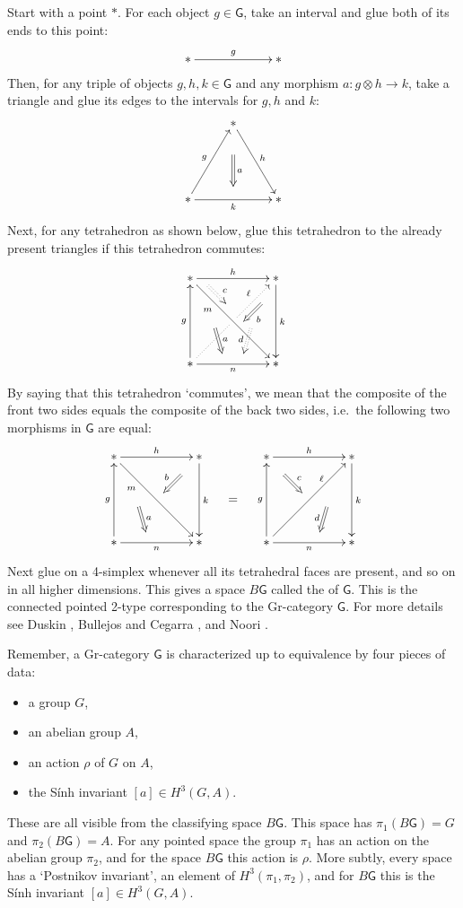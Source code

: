 \documentclass[reqno,12pt]{amsart}
\newcommand{\maps}{\colon}    %
\newcommand{\G}{{\mathsf{G}}}   %
\newcommand{\define}[1]{\textbf{\boldmath{#1}}}
\theoremstyle{definition}
\begin{document}
Start with a point $\ast$.  For each object $g \in \G$, take an interval and glue both of its ends to this point:
\[
\xy 0;/r3pc/:
   (0,0)*+{\ast}="x";
    (2,0)*+{\ast}="z";
 {\ar^{g} "x";"z"};
\endxy
\]
Then, for any triple of objects $g,h,k \in \G$ and any morphism $a \maps g \otimes h \to k$, take a triangle and glue its edges to the intervals for $g, h$ and $k$:
\[
\xy 0;/r3pc/:
   (0,0)*+{\ast}="x";
    (1,1.7)*+{\ast}="y";
    (2,0)*+{\ast}="z";
{\ar@2{->}^-{a} (1,1)*{};(1,0.3)*{}};
 {\ar^{g} "x";"y"};
 {\ar^{h} "y";"z"};
 {\ar_{k} "x";"z"};
\endxy
\]
Next, for any tetrahedron as shown below, glue this tetrahedron to the already present triangles if this tetrahedron commutes:
\[
{\xy 
(12,-12)*+{\ast}="1"; 
(12,12)*+{\ast}="2"; 
(-12,12)*+{\ast}="3"; 
(-12,-12)*+{\ast}="4"; 
(0,0)*+{}="0"; 
{\ar^-{k} "2";"1"}; 
{\ar^-{h} "3";"2"}; 
{\ar^-{g} "4";"3"};
{\ar_-{n} "4";"1"};
{\ar@{.>}^(0.5){\tiny{\ell}} "0";"2"};
{\ar@{.} "4";"0"};
{\ar_(0.3){m} "3";"1"};
{\ar@2{->}^-{a} (-5,-2)*{};(-3,-9)*{}};
{\ar@2{->}^-{b} (8,5)*{};(3,0)*{}};
{\ar@2{.>}^(0.6){c} (-7,10)*{};(-2,5)*{}};
{\ar@2{.>}_-{d} (5,-2)*{};(3,-9)*{}};
\endxy}
\]
\noindent
By saying that this tetrahedron `commutes', we mean that the composite
of the front two sides equals the composite of the back two sides, i.e.\ the following two morphisms in $\G$ are equal:
\[
{\xy 
(12,-12)*+{\ast}="1"; 
(12,12)*+{\ast}="2"; 
(-12,12)*+{\ast}="3"; 
(-12,-12)*+{\ast}="4"; 
{\ar^-{k} "2";"1"}; 
{\ar^-{h} "3";"2"}; 
{\ar^-{g} "4";"3"};
{\ar_-{n} "4";"1"};
{\ar_(0.3){m} "3";"1"};
{\ar@2{->}^-{a} (-5,-2)*{};(-3,-9)*{}};
{\ar@2{->}_-{b} (7,7)*{};(2,2)*{}};
\endxy}
\quad = \quad
{\xy 
(12,-12)*+{\ast}="1"; 
(12,12)*+{\ast}="2"; 
(-12,12)*+{\ast}="3"; 
(-12,-12)*+{\ast}="4"; 
{\ar^-{k} "2";"1"}; 
{\ar^-{h} "3";"2"}; 
{\ar^-{g} "4";"3"};
{\ar_-{n} "4";"1"};
{\ar_{} "4";"2"}; 
(3.5,6)*+{\scriptstyle{\ell}};
{\ar@2{->}^(0.5){c} (-7,7)*{};(-2,2)*{}};
{\ar@2{->}_-{d} (5,-2)*{};(3,-9)*{}};
\endxy}
\]
Next  glue on a 4-simplex whenever all its tetrahedral faces are present, and so on in all higher dimensions. This gives a space $B\G$ called the \define{classifying space} of $\G$.  This is the connected pointed 2-type corresponding to the Gr-category $\G$.  For more details see Duskin \cite{D01}, Bullejos and Cegarra \cite{BC03}, and Noori \cite{N08}.

Remember, a Gr-category $\G$ is characterized up to equivalence by four pieces of data:
\begin{itemize}
\item a group $G$,
\item an abelian group $A$,
\item an action $\rho$ of $G$ on $A$,
\item the S\'inh invariant $[a] \in H^3(G,A)$.
\end{itemize}
These are all visible from the classifying space $B\G$.  This space has $\pi_1(B\G) = G$ and $\pi_2(B\G) = A$.  For any pointed space the group $\pi_1$ has an action on the abelian group $\pi_2$, and for the space $B\G$ this action is $\rho$.  More subtly, every space has a `Postnikov invariant', an element of $H^3(\pi_1,\pi_2)$, and for $B\G$ this is the S\'inh invariant $[a] \in H^3(G,A)$.
\end{document}
